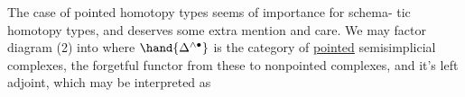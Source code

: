 The case of pointed homotopy types seems of importance for schema-%
tic homotopy types, and deserves some extra mention and care. We may
factor diagram (2) into
where $\hand{\Delta^{\wedge\bullet}}$ is the category of \uline{pointed} semisimplicial complexes, \hand{$\beta$} the
 forgetful functor from these to nonpointed complexes, and \hand{$\alpha$} it's
left adjoint, which may be interpreted as

